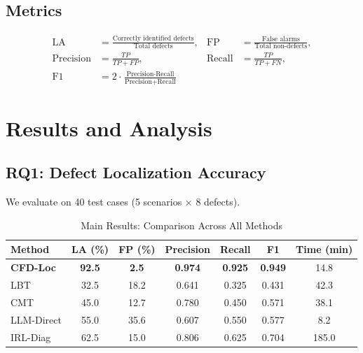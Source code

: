 \documentclass[conference]{IEEEtran}
\theoremstyle{plain}
\newcommand{\methodname}{\textbf{CFD-Loc}}
\begin{document}
\subsection{Metrics}
\begin{align*}
\text{LA} &= \frac{\text{Correctly identified defects}}{\text{Total defects}}, &
\text{FP} &= \frac{\text{False alarms}}{\text{Total non-defects}},\\
\text{Precision} &= \frac{TP}{TP+FP}, &
\text{Recall} &= \frac{TP}{TP+FN},\\
\text{F1} &= 2\cdot\frac{\text{Precision}\cdot\text{Recall}}{\text{Precision}+\text{Recall}}
\end{align*}

\section{Results and Analysis}
\label{sec:results}

\subsection{RQ1: Defect Localization Accuracy}
We evaluate on 40 test cases (5 scenarios $\times$ 8 defects).

\begin{table}[t]
\centering
\caption{Main Results: Comparison Across All Methods}
\label{tab:main}
\small
\begin{tabular}{lcccccc}
\toprule
\textbf{Method} & \textbf{LA (\%)} & \textbf{FP (\%)} & \textbf{Precision} & \textbf{Recall} & \textbf{F1} & \textbf{Time (min)}\\\midrule
\rowcolor{accentgreen!12}
\methodname & \textbf{92.5} & \textbf{2.5} & \textbf{0.974} & \textbf{0.925} & \textbf{0.949} & 14.8\\
LBT & 32.5 & 18.2 & 0.641 & 0.325 & 0.431 & 42.3\\
CMT & 45.0 & 12.7 & 0.780 & 0.450 & 0.571 & 38.1\\
LLM-Direct & 55.0 & 35.6 & 0.607 & 0.550 & 0.577 & 8.2\\
IRL-Diag & 62.5 & 15.0 & 0.806 & 0.625 & 0.704 & 185.0\\
\bottomrule
\end{tabular}
\end{table}
\end{document}
